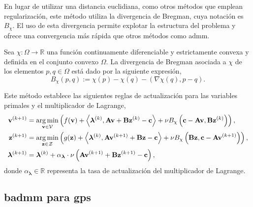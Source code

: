 En lugar de utilizar una distancia euclidiana, como otros métodos que emplean regularización, este método utiliza la divergencia de Bregman, cuya notación es $B_{\chi}$. El uso de esta divergencia permite explotar la estructura del problema y ofrece una convergencia más rápida que otros métodos como \acrfull{admm}. \cite{wang2014bregman} 

\begin{definition}
    Sea $\chi: \Omega \rightarrow \mathbb{R}$ una función continuamente diferenciable y estrictamente convexa y definida en el conjunto convexo $\Omega$. La divergencia de Bregman asociada a $\chi$ de los elementos $p, q \in \Omega$ está dado por la siguiente expresión,
    $$B_{\chi}(p, q) := \chi(p)-\chi(q)-\left(\nabla \chi(q), p-q\right).$$
\end{definition}
Este método establece las siguientes reglas de actualización para las variables primales y el multiplicador de Lagrange, 
\begin{align}
    \mathbf{v}^{(k+1)} &= \operatorname*{arg\,min}_{\mathbf{v}\in \mathcal{V}} \left(f(\mathbf{v}) + \left\langle \bm\lambda^{(k)}, \mathbf{Av}+\mathbf{B}\mathbf{z}^{(k)}-\mathbf{c}\right\rangle + \nu B_{\chi}\left(\mathbf{c}-\mathbf{Av}, \mathbf{B}\mathbf{z}^{(k)}\right)\right), \\
    \mathbf{z}^{(k+1)} &= \operatorname*{arg\,min}_{\mathbf{z} \in \mathcal{Z}} \left(g(\mathbf{z}) + \left\langle\bm\lambda^{(k)}, \mathbf{A}\mathbf{v}^{(k+1)} + \mathbf{Bz-c}\right\rangle + \nu B_{\chi} \left(\mathbf{Bz}, \mathbf{c}-\mathbf{Av}^{(k+1)}\right)\right), \\
    \bm\lambda^{(k+1)} &= \bm\lambda^{(k)} + \alpha_{\bm\lambda}\cdot\nu \left(\mathbf{Av}^{(k+1)}  + \mathbf{Bz}^{(k+1)}-\mathbf{c}\right), 
\end{align}
donde $\alpha_{\bm\lambda} \in \mathbb{R}$ representa la tasa de actualización del multiplicador de Lagrange. \cite{wang2014bregman}

\subsection{\acrshort{badmm} para \acrshort{gps}}


